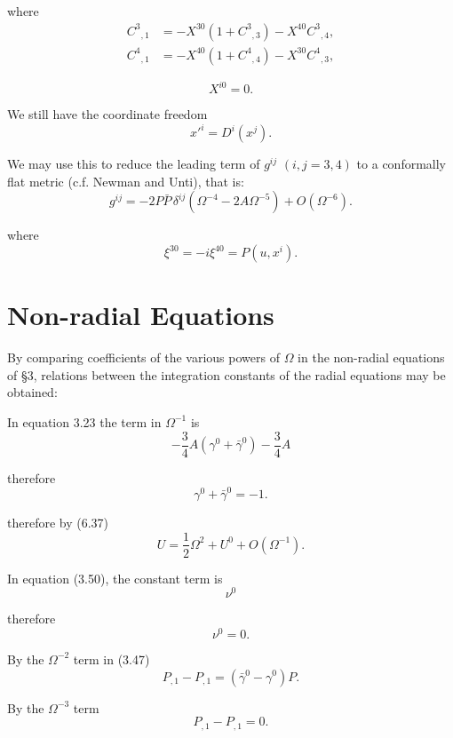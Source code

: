 where
\begin{equation}
\begin{aligned}
C^3{}_{,1}
&=
-X^{30}\left(1+C^3{}_{,3}\right)
-X^{40}C^3{}_{,4},
\\
C^4{}_{,1}
&=
-X^{40}\left(1+C^4{}_{,4}\right)
-X^{30}C^4{}_{,3},
\end{aligned}
\tag{6.42}
\end{equation}

\[
X^{i0}=0.
\]

We still have the coordinate freedom
\[
x'^i = D^i(x^j).
\]

We may use this to reduce the leading term of
$g^{ij}$ $(i,j=3,4)$ to a conformally flat metric
(c.f. Newman and Unti), that is:
\begin{equation}
g^{ij}
=
-2P\bar{P}\,\delta^{ij}
\left(
\Omega^{-4}
-
2A\Omega^{-5}
\right)
+
O(\Omega^{-6}).
\tag{6.43}
\end{equation}

where
\[
\xi^{30} = -i\xi^{40} = P(u,x^i).
\]

\section{Non-radial Equations}

By comparing coefficients of the various powers of $\Omega$
in the non-radial equations of \S 3, relations between
the integration constants of the radial equations may be
obtained:

In equation 3.23 the term in $\Omega^{-1}$ is
\[
-\frac{3}{4}A\left(\gamma^0+\bar{\gamma}^0\right)
-\frac{3}{4}A
\]

therefore
\begin{equation}
\gamma^0+\bar{\gamma}^0=-1.
\tag{7.1}
\end{equation}

therefore by (6.37)
\begin{equation}
U
=
\frac{1}{2}\Omega^2
+
U^0
+
O(\Omega^{-1}).
\tag{7.2}
\end{equation}

In equation (3.50), the constant term is
\[
\nu^0
\]

therefore
\begin{equation}
\nu^0=0.
\tag{7.3}
\end{equation}

By the $\Omega^{-2}$ term in (3.47)
\[
P_{,1}-P_{,1}
=
\left(\bar{\gamma}^0-\gamma^0\right)P.
\]

By the $\Omega^{-3}$ term
\[
P_{,1}-P_{,1}=0.
\]

